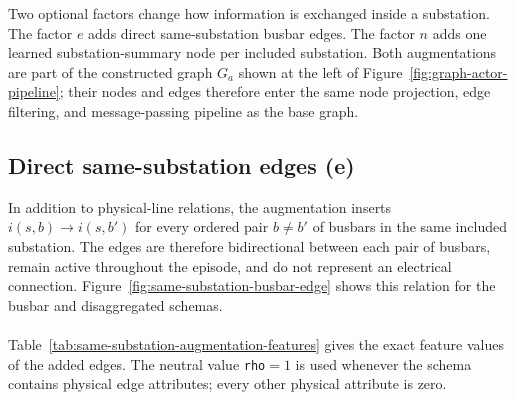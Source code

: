 Two optional factors change how information is exchanged inside a substation.
The factor $e$ adds direct same-substation busbar edges. The factor $n$ adds one
learned substation-summary node per included substation. Both augmentations are
part of the constructed graph $G_a$ shown at the left of
Figure~\ref{fig:graph-actor-pipeline}; their nodes and edges therefore enter the
same node projection, edge filtering, and message-passing pipeline as the base
graph.

\subsection{Direct same-substation edges (e)}
\label{subsec:graph-relation-edges}

In addition to physical-line relations, the augmentation inserts
$i(s,b)\rightarrow i(s,b')$ for every ordered pair $b\neq b'$ of busbars in the
same included substation. The edges are therefore bidirectional between each
pair of busbars, remain active throughout the episode, and do not represent an
electrical connection. Figure~\ref{fig:same-substation-busbar-edge} shows this
relation for the busbar and disaggregated schemas.
\\
\\
Table~\ref{tab:same-substation-augmentation-features} gives the exact feature
values of the added edges. The neutral value \texttt{rho}$=1$ is used whenever
the schema contains physical edge attributes; every other physical attribute is
zero.

